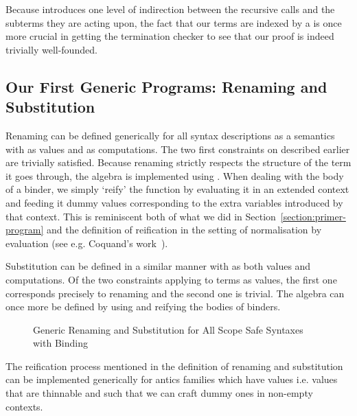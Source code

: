 Because  introduces one level of indirection between the
recursive calls and the subterms they are acting upon, the fact
that our terms are indexed by a  is once more crucial in
getting the termination checker to see that our proof is indeed
trivially well-founded.

\subsection{Our First Generic Programs: Renaming and Substitution}

Renaming can be defined generically for all syntax descriptions as a
semantics with  as values and  as computations. The
two first constraints on  described earlier are trivially
satisfied. Because renaming strictly respects the structure of the
term it goes through, the algebra is implemented using .
When dealing with the body of a binder, we simply `reify' the
 function by evaluating it in an extended context and
feeding it dummy values corresponding to the extra variables
introduced by that context. This is reminiscent both of what we
did in Section~\ref{section:primer-program} and the definition
of reification in the setting of normalisation by evaluation
(see e.g. Coquand's work~\citeyear{coquand2002formalised}).

Substitution can be defined in a similar manner with  as both
values and computations. Of the two constraints applying to terms as
values, the first one corresponds precisely to renaming and the second
one is trivial. The algebra can once more be defined by using 
and reifying the bodies of binders.

\begin{figure}[h]
\begin{minipage}{0.45\textwidth}
\end{minipage}\hspace{2em}
\begin{minipage}{0.45\textwidth}
\end{minipage}
\caption{Generic Renaming and Substitution for All Scope Safe Syntaxes with Binding}
\end{figure}

The reification process mentioned in the definition of renaming
and substitution can be implemented generically for antics
families which have  values i.e. values that are thinnable
and such that we can craft dummy ones in non-empty contexts.

